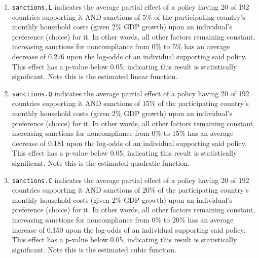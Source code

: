 \documentclass[12pt,letterpaper]{article}
\begin{document}
\begin{enumerate}
\begin{enumerate}
		\item \texttt{sanctions.L} indicates the average partial effect of a policy having 20 of 192 countries supporting it AND sanctions of 5\% of the participating country's monthly household costs (given 2\% GDP growth) upon an individual's preference (choice) for it. In other words, all other factors remaining constant, increasing sanctions for noncompliance from 0\% to 5\% has an average decrease of 0.276 upon the log-odds of an individual supporting said policy. This effect has a p-value below 0.05, indicating this result is statistically significant. Note this is the estimated linear function.
		
		\item \texttt{sanctions.Q} indicates the average partial effect of a policy having 20 of 192 countries supporting it AND sanctions of 15\% of the participating country's monthly household costs (given 2\% GDP growth) upon an individual's preference (choice) for it. In other words, all other factors remaining constant, increasing sanctions for noncompliance from 0\% to 15\% has an average decrease of 0.181 upon the log-odds of an individual supporting said policy. This effect has a p-value below 0.05, indicating this result is statistically significant. Note this is the estimated quadratic function.
		
		\item \texttt{sanctions.C} indicates the average partial effect of a policy having 20 of 192 countries supporting it AND sanctions of 20\% of the participating country's monthly household costs (given 2\% GDP growth) upon an individual's preference (choice) for it. In other words, all other factors remaining constant, increasing sanctions for noncompliance from 0\% to 20\% has an average increase of 0.150 upon the log-odds of an individual supporting said policy. This effect has a p-value below 0.05, indicating this result is statistically significant. Note this is the estimated cubic function.
		
	\end{enumerate}
	

\end{enumerate}
\end{document}

